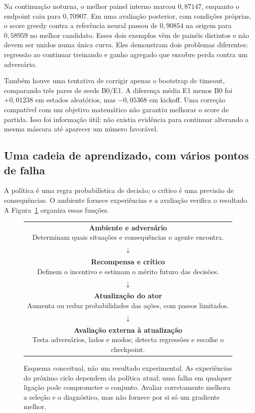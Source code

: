 \documentclass[11pt,a4paper]{article}
\begin{document}
Na continuação noturna, o melhor painel interno marcou $0{,}87147$, enquanto o endpoint caiu para $0{,}70907$. Em uma avaliação posterior, com condições próprias, o score greedy contra a referência neural passou de $0{,}90854$ na origem para $0{,}58959$ no melhor candidato. Esses dois exemplos vêm de painéis distintos e não devem ser unidos numa única curva. Eles demonstram dois problemas diferentes: regressão ao continuar treinando e ganho agregado que encobre perda contra um adversário.

Também houve uma tentativa de corrigir apenas o bootstrap de timeout, comparando três pares de seeds B0/E1. A diferença média E1 menos B0 foi $+0{,}01238$ em estados aleatórios, mas $-0{,}05368$ em kickoff. Uma correção compatível com um objetivo matemático não garantiu melhorar o score de partida. Isso foi informação útil: não existia evidência para continuar alterando a mesma máscara até aparecer um número favorável.

\subsection{Uma cadeia de aprendizado, com vários pontos de falha}
A política é uma regra probabilística de decisão; o crítico é uma previsão de consequências. O ambiente fornece experiências e a avaliação verifica o resultado. A Figura~\ref{fig:chain} organiza essas funções.
\begin{figure}[htbp]\centering\small
\begin{tabular}{c}
\fbox{\parbox{.86\linewidth}{\centering\textbf{Ambiente e adversário}\\Determinam quais situações e consequências o agente encontra.}}\\[3pt]
$\downarrow$\\[3pt]
\fbox{\parbox{.86\linewidth}{\centering\textbf{Recompensa e crítico}\\Definem o incentivo e estimam o mérito futuro das decisões.}}\\[3pt]
$\downarrow$\\[3pt]
\fbox{\parbox{.86\linewidth}{\centering\textbf{Atualização do ator}\\Aumenta ou reduz probabilidades das ações, com passos limitados.}}\\[3pt]
$\downarrow$\\[3pt]
\fbox{\parbox{.86\linewidth}{\centering\textbf{Avaliação externa à atualização}\\Testa adversários, lados e modos; detecta regressões e escolhe o checkpoint.}}
\end{tabular}
\caption{Esquema conceitual, não um resultado experimental. As experiências do próximo ciclo dependem da política atual; uma falha em qualquer ligação pode comprometer o conjunto. Avaliar corretamente melhora a seleção e o diagnóstico, mas não fornece por si só um gradiente melhor.}\label{fig:chain}
\end{figure}
\end{document}
